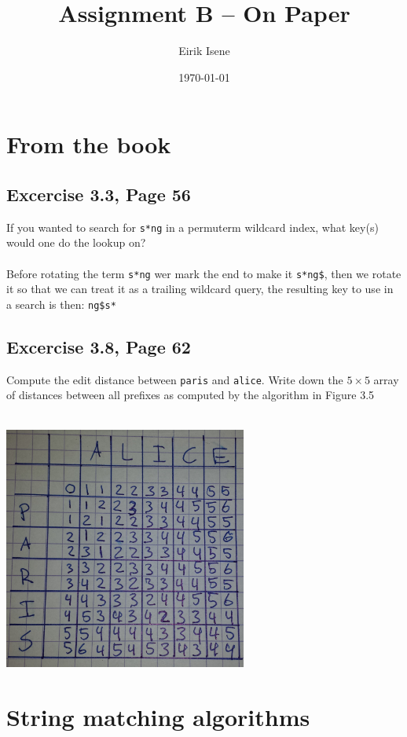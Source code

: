 \documentclass{article}
\title{Assignment B -- On Paper}
\author{Eirik Isene}
\date{\today}
\begin{document}
\maketitle

\section{From the book}
\subsection{Excercise 3.3, Page 56}
If you wanted to search for {\tt s*ng} in a permuterm wildcard index, what key(s) would one do the lookup on? \\ \\
Before rotating the term {\tt s*ng} wer mark the end to make it {\tt s*ng\$}, then we rotate it so that we can treat it as a trailing wildcard query, the resulting key to use in a search is then: {\tt ng\$s*}
\subsection{Excercise 3.8, Page 62}
Compute the edit distance between {\tt paris} and {\tt alice}. Write down the $5 \times 5$ array of distances between all prefixes as computed by the algorithm in Figure 3.5 \\ \\
\begin{center}\includegraphics[width=8cm]{editDistance.jpg}\end{center}
\section{String matching algorithms}
\end{document}
